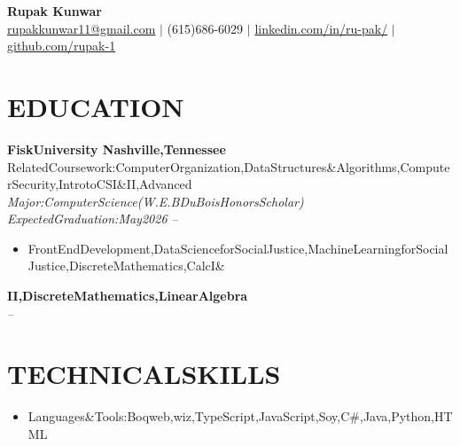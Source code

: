 \documentclass[letterpaper,10pt]{article}
\begin{document}
\begin{center}
  {\LARGE\bfseries Rupak Kunwar} \\[4pt]
  \small
  \href{mailto:rupakkunwar11@gmail.com}{rupakkunwar11@gmail.com}   $|$ (615)686-6029   $|$ \href{https://linkedin.com/in/ru-pak/}{linkedin.com/in/ru-pak/}   $|$ \href{https://github.com/rupak-1}{github.com/rupak-1}  \end{center}

\section{EDUCATION}
\textbf{FiskUniversity Nashville,Tennessee} \hfill RelatedCoursework:ComputerOrganization,DataStructures\&Algorithms,ComputerSecurity,IntrotoCSI\&II,Advanced \\
\textit{Major:ComputerScience(W.E.BDuBoisHonorsScholar) ExpectedGraduation:May2026} \hfill \textit{ -- }
\begin{itemize}
  \item FrontEndDevelopment,DataScienceforSocialJustice,MachineLearningforSocialJustice,DiscreteMathematics,CalcI\&
\end{itemize}
\vspace{2pt}\textbf{II,DiscreteMathematics,LinearAlgebra} \hfill  \\
\textit{} \hfill \textit{ -- }
\vspace{2pt}








\section{TECHNICALSKILLS}
\begin{itemize}
  \item Languages\&Tools:Boqweb,wiz,TypeScript,JavaScript,Soy,C\#,Java,Python,HTML
\end{itemize}
\end{document}
